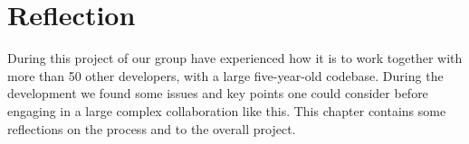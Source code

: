 \chapter{Reflection}
\label{cha:reflection}

During this project of \giraf our group have experienced how it is to work together with more than 50 other developers, with a large five-year-old codebase. During the development we found some issues and key points one could consider before engaging in a large complex collaboration like this. This chapter contains some reflections on the process and to the overall project.



